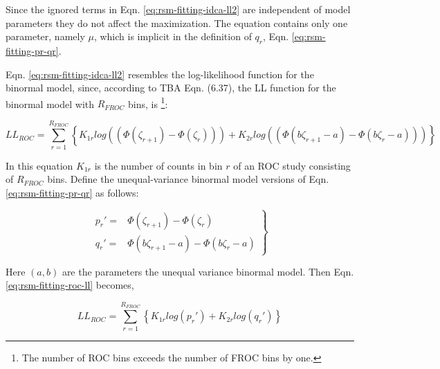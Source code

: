 \documentclass[
]{book}
\begin{document}
Since the ignored terms in Eqn. \eqref{eq:rsm-fitting-idca-ll2} are independent of model parameters they do not affect the maximization. The equation contains only one parameter, namely \(\mu\), which is implicit in the definition of \(q_r\), Eqn. \eqref{eq:rsm-fitting-pr-qr}.

Eqn. \eqref{eq:rsm-fitting-idca-ll2} resembles the log-likelihood function for the binormal model, since, according to TBA Eqn. (6.37), the LL function for the binormal model with \(R_{FROC}\) bins, is \footnote{The number of ROC bins exceeds the number of FROC bins by one.}:

\begin{equation}
LL_{ROC} = \sum_{r=1}^{R_{FROC}} \left \{ K_{1r} log\left ( \left ( \Phi \left ( \zeta_{r+1} \right ) - \Phi \left ( \zeta_{r} \right ) \right ) \right ) + K_{2r} log\left ( \left ( \Phi\left ( b\zeta_{r+1} -a \right ) - \Phi\left ( b\zeta_{r} - a \right ) \right ) \right ) \right \} 
\label{eq:rsm-fitting-roc-ll}
\end{equation}

In this equation \(K_{1r}\) is the number of counts in bin \(r\) of an ROC study consisting of \(R_{FROC}\) bins. Define the unequal-variance binormal model versions of Eqn. \eqref{eq:rsm-fitting-pr-qr} as follows:

\begin{equation}
\left. 
\begin{aligned}
p_r' = & \Phi\left ( \zeta_{r+1} \right ) - \Phi\left ( \zeta_r \right ) \\
q_r' = & \Phi\left ( b\zeta_{r+1} - a \right ) - \Phi\left ( b \zeta_r  - a \right ) 
\end{aligned}
\right \}
\label{eq:rsm-fitting-pr-qr-prime}
\end{equation}

Here \((a,b)\) are the parameters the unequal variance binormal model. Then Eqn. \eqref{eq:rsm-fitting-roc-ll} becomes,

\begin{equation}
LL_{ROC} = \sum_{r=1}^{R_{FROC}} \left \{ K_{1r} log\left ( p_r' \right ) + K_{2r} log\left ( q_r' \right ) \right \} 
\label{eq:rsm-fitting-idca-roc-ll2}
\end{equation}
\end{document}
